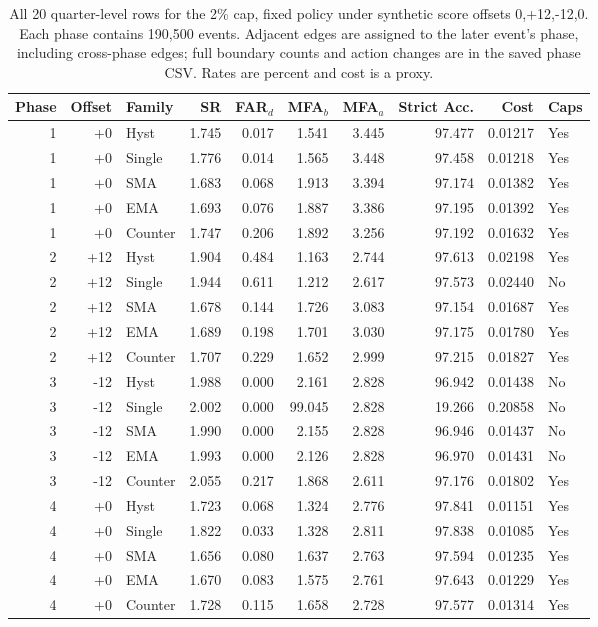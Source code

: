 \begin{table}[!htbp]
\centering
\caption{All 20 quarter-level rows for the 2\% cap, fixed policy under synthetic score offsets 0,+12,-12,0. Each phase contains 190,500 events. Adjacent edges are assigned to the later event's phase, including cross-phase edges; full boundary counts and action changes are in the saved phase CSV. Rates are percent and cost is a proxy.}
\label{tab:supp_shift_phase_2_fixed}
\scriptsize
\setlength{\tabcolsep}{2.6pt}
\begin{tabular}{rrlrrrrrrl}
\toprule
Phase & Offset & Family & SR & FAR$_d$ & MFA$_b$ & MFA$_a$ & Strict Acc. & Cost & Caps\\
\midrule
1 & +0 & Hyst & 1.745 & 0.017 & 1.541 & 3.445 & 97.477 & 0.01217 & Yes \\
1 & +0 & Single & 1.776 & 0.014 & 1.565 & 3.448 & 97.458 & 0.01218 & Yes \\
1 & +0 & SMA & 1.683 & 0.068 & 1.913 & 3.394 & 97.174 & 0.01382 & Yes \\
1 & +0 & EMA & 1.693 & 0.076 & 1.887 & 3.386 & 97.195 & 0.01392 & Yes \\
1 & +0 & Counter & 1.747 & 0.206 & 1.892 & 3.256 & 97.192 & 0.01632 & Yes \\
2 & +12 & Hyst & 1.904 & 0.484 & 1.163 & 2.744 & 97.613 & 0.02198 & Yes \\
2 & +12 & Single & 1.944 & 0.611 & 1.212 & 2.617 & 97.573 & 0.02440 & No \\
2 & +12 & SMA & 1.678 & 0.144 & 1.726 & 3.083 & 97.154 & 0.01687 & Yes \\
2 & +12 & EMA & 1.689 & 0.198 & 1.701 & 3.030 & 97.175 & 0.01780 & Yes \\
2 & +12 & Counter & 1.707 & 0.229 & 1.652 & 2.999 & 97.215 & 0.01827 & Yes \\
3 & -12 & Hyst & 1.988 & 0.000 & 2.161 & 2.828 & 96.942 & 0.01438 & No \\
3 & -12 & Single & 2.002 & 0.000 & 99.045 & 2.828 & 19.266 & 0.20858 & No \\
3 & -12 & SMA & 1.990 & 0.000 & 2.155 & 2.828 & 96.946 & 0.01437 & No \\
3 & -12 & EMA & 1.993 & 0.000 & 2.126 & 2.828 & 96.970 & 0.01431 & No \\
3 & -12 & Counter & 2.055 & 0.217 & 1.868 & 2.611 & 97.176 & 0.01802 & Yes \\
4 & +0 & Hyst & 1.723 & 0.068 & 1.324 & 2.776 & 97.841 & 0.01151 & Yes \\
4 & +0 & Single & 1.822 & 0.033 & 1.328 & 2.811 & 97.838 & 0.01085 & Yes \\
4 & +0 & SMA & 1.656 & 0.080 & 1.637 & 2.763 & 97.594 & 0.01235 & Yes \\
4 & +0 & EMA & 1.670 & 0.083 & 1.575 & 2.761 & 97.643 & 0.01229 & Yes \\
4 & +0 & Counter & 1.728 & 0.115 & 1.658 & 2.728 & 97.577 & 0.01314 & Yes \\
\bottomrule
\end{tabular}
\end{table}
